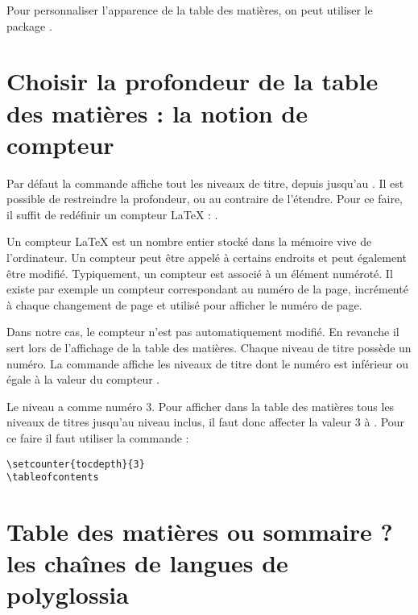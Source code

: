 \begin{plusloins}

Pour personnaliser l'apparence de la table des matières, on peut utiliser le package . 
\end{plusloins}

\section[Choix de la profondeur]{Choisir la profondeur de la table des matières : la notion de compteur}\label{tocdepth}

Par défaut la commande  affiche tout les niveaux de titre, depuis  jusqu'au . Il est possible de restreindre la profondeur, ou au contraire de l'étendre. Pour ce faire, il suffit de redéfinir un compteur \LaTeX{} : .

Un compteur \LaTeX{} est un nombre entier stocké dans la mémoire vive de l'ordinateur. Un compteur peut être appelé à certains endroits et peut également être modifié. Typiquement, un compteur est associé à un élément numéroté. Il existe par exemple un compteur  correspondant au numéro de la page, incrémenté  à chaque changement de page et utilisé pour afficher le numéro de page.\label{compteur}

Dans notre cas, le compteur  n'est pas automatiquement modifié. En revanche il sert lors de l'affichage de la table des matières. Chaque niveau de titre possède un numéro. La commande  affiche les niveaux de titre dont le numéro est inférieur ou égale à la valeur du compteur .

Le niveau  a comme numéro 3. Pour afficher dans la table des matières tous les niveaux de titres jusqu'au niveau  inclus, il faut donc affecter la valeur 3 à  . Pour ce faire il faut utiliser la commande  :

\begin{verbatim}
\setcounter{tocdepth}{3}
\tableofcontents
\end{verbatim}

\section[Table des matières ou sommaire ?]{Table des matières ou sommaire ? les chaînes de langues de polyglossia}

